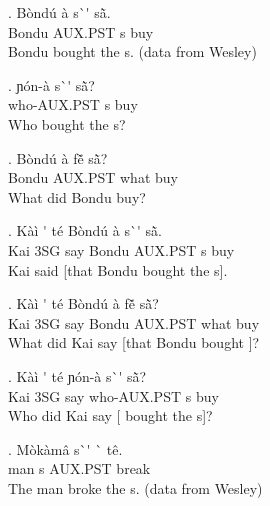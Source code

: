 \documentclass{assets/fieldnotes}
\begin{document}
{


\exg. B\`{o}nd\'{u} \`{a} s\`{}\'{} sã̀. \\ 
Bondu AUX.PST s buy \\
Bondu bought the s. (data from Wesley)

\exg. ɲ\'{o}n-\`{a} s\`{}\'{} sã̀? \\ 
who-AUX.PST s buy \\
Who bought the s?

\exg. B\`{o}nd\'{u} \`{a} fẽ̌ sã̀? \\ 
Bondu AUX.PST what buy \\
What did Bondu buy?

\exg. K\`{a}\`{i} \'{} t\'{e} B\`{o}nd\'{u} \`{a} s\`{}\'{} sã̀. \\ 
Kai 3SG say Bondu AUX.PST s buy \\
Kai said [that Bondu bought the s].


\exg. K\`{a}\`{i} \'{} t\'{e} B\`{o}nd\'{u} \`{a} fẽ̌  sã̀? \\ 
Kai 3SG say Bondu AUX.PST what buy \\
What did Kai say [that Bondu bought ]? 

\exg. K\`{a}\`{i} \'{} t\'{e} ɲ\'{o}n-\`{a} s\`{}\'{} sã̀? \\ 
Kai 3SG say who-AUX.PST s buy \\
Who did Kai say [ bought the s]? 


\exg. M\`{o}k\`{a}m\^{a} s\`{}\'{} \`{} t\^{e}. \\
man s AUX.PST break \\
The man broke the s. (data from Wesley)

}
\end{document}
